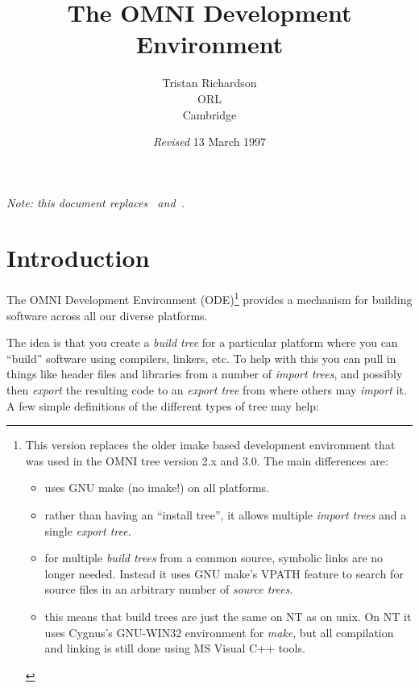 \documentclass[11pt,twoside,onecolumn]{article}
\title{The OMNI Development Environment}
\author{Tristan Richardson\\
        ORL\\
        Cambridge}
\date{{\it Revised} 13 March 1997}
\begin{document}
\maketitle

\begin{center}
{\it Note: this document replaces~\cite{lo95} and~\cite{ward95}.}

\end{center}

\vspace{0.2in}

\section{Introduction}

The OMNI Development Environment (ODE)\footnote{This version replaces
the older imake based development environment that was used in the OMNI
tree version 2.x and 3.0. The main differences are:

\begin{itemize}

\item uses GNU make (no imake!) on all platforms.

\item rather than having an ``install tree'', it allows multiple {\em
import trees} and a single {\em export tree}.

\item for multiple {\em build trees} from a common source, symbolic links are
no longer needed.  Instead it uses GNU make's VPATH feature to search for
source files in an arbitrary number of {\em source trees}.

\item this means that build trees are just the same on NT as on unix.  On NT it
uses Cygnus's GNU-WIN32 environment for {\em make}, but all compilation and
linking is still done using MS Visual C++ tools.

\end{itemize}} provides a mechanism for building
software across all our diverse platforms.

The idea is that you create a {\em build tree} for a particular platform where
you can ``build'' software using compilers, linkers, etc.  To help with this
you can pull in things like header files and libraries from a number of {\em
import trees}, and possibly then {\em export} the resulting code to an {\em
export tree} from where others may {\em import} it.  A few simple definitions
of the different types of tree may help:
\end{document}
